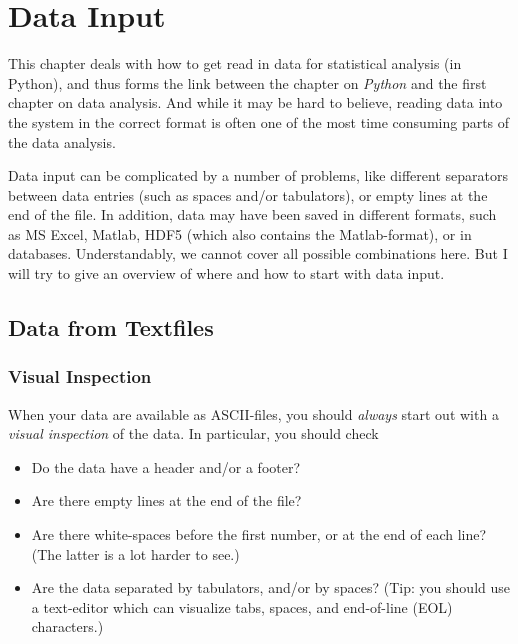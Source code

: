 \chapter{Data Input}

This chapter deals with how to get read in data for statistical analysis (in Python), and thus forms the link between the chapter on \emph{Python} and the first chapter on data analysis. And while it may be hard to believe, reading data into the system in the correct format is often one of the most time consuming parts of the data analysis.

\vspace{5 mm}

Data input can be complicated by a number of problems, like different separators between data entries (such as spaces and/or tabulators), or empty lines at the end of the file. In addition, data may have been saved in different formats, such as MS Excel, Matlab,  HDF5 (which also contains the Matlab-format), or in databases. Understandably, we cannot cover all possible combinations here. But I will try to give an overview of where and how to start with data input.

\section{Data from Textfiles}

\subsection{Visual Inspection}

When your data are available as ASCII-files, you should \emph{always } start out with a \emph{visual inspection }of the data. In particular, you should check

\begin{itemize}
  \item Do the data have a header and/or a footer?
  \item Are there empty lines at the end of the file?
  \item Are there white-spaces before the first number, or at the end of each line? (The latter is a lot harder to see.)
  \item Are the data separated by tabulators, and/or by spaces? (Tip: you should use a text-editor which can visualize tabs, spaces, and end-of-line (EOL) characters.)
\end{itemize}

